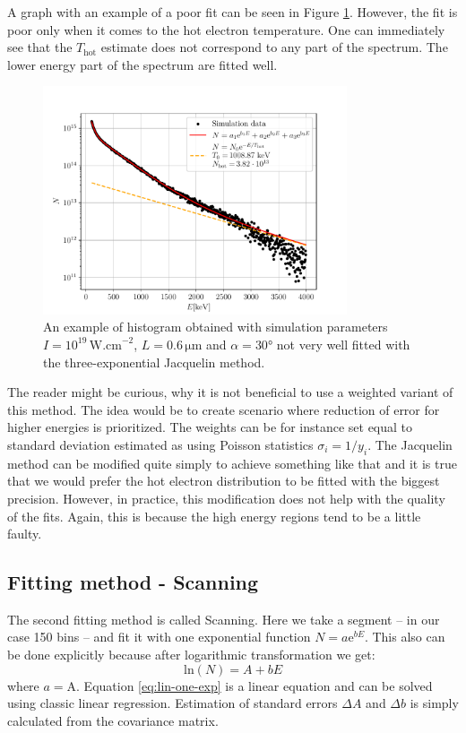 A graph with an example of a poor fit can be seen in Figure \ref{fig:3exp-ex-bad}. However, the fit is poor only when it comes to the hot electron temperature. One can immediately see that the $T_\mathrm{hot}$ estimate does not correspond to any part of the spectrum. The lower energy part of the spectrum are fitted well.
\begin{figure}[ht]
	\centering
		\includegraphics[width=0.8\textwidth]{figures/3exp-ex-bad}
		\caption{An example of histogram obtained with simulation parameters $I=10^{19}\,\mathrm{W.cm}^{-2}$, $L=0.6\,\mathrm{\mu m}$ and $\alpha = 30$° not very well fitted with the three-exponential Jacquelin method.}
		\label{fig:3exp-ex-bad}
\end{figure}

The reader might be curious, why it is not beneficial to use a weighted variant of this method. The idea would be to create scenario where reduction of error for higher energies is prioritized. The weights can be for instance set equal to standard deviation estimated as using Poisson statistics $\sigma_i = 1/y_i$.
The Jacquelin method can be modified quite simply to achieve something like that and it is true that we would prefer the hot electron distribution to be fitted with the biggest precision. However, in practice, this modification does not help with the quality of the fits. Again, this is because the high energy regions tend to be a little faulty.

\subsection*{Fitting method - Scanning}
The second fitting method is called Scanning. Here we take a segment -- in our case 150 bins -- and fit it with one exponential function $N = a\mathrm{e}^{bE}$. This also can be done explicitly because after logarithmic transformation we get:
\begin{equation}
	\label{eq:lin-one-exp}
	\mathrm{ln}(N) = A + bE
\end{equation}
where $a = \mathrm{A}$. Equation \ref{eq:lin-one-exp} is a linear equation and can be solved using classic linear regression. Estimation of standard errors $\Delta A$ and $\Delta b$ is simply calculated from the covariance matrix.

